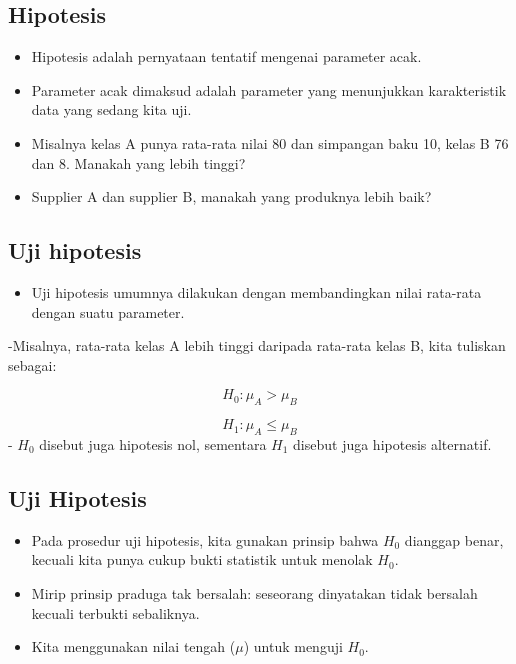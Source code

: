 \documentclass[
  letterpaper,
  DIV=11,
  numbers=noendperiod]{scrartcl}
\providecommand{\tightlist}{%
  \setlength{\itemsep}{0pt}\setlength{\parskip}{0pt}}\usepackage{longtable,booktabs,array}
\begin{document}
\subsection{Hipotesis}\label{hipotesis}

\begin{itemize}
\item
  Hipotesis adalah pernyataan tentatif mengenai parameter acak.
\item
  Parameter acak dimaksud adalah parameter yang menunjukkan
  karakteristik data yang sedang kita uji.
\item
  Misalnya kelas A punya rata-rata nilai 80 dan simpangan baku 10, kelas
  B 76 dan 8. Manakah yang lebih tinggi?
\item
  Supplier A dan supplier B, manakah yang produknya lebih baik?
\end{itemize}

\subsection{Uji hipotesis}\label{uji-hipotesis-1}

\begin{itemize}
\tightlist
\item
  Uji hipotesis umumnya dilakukan dengan membandingkan nilai rata-rata
  dengan suatu parameter.
\end{itemize}

-Misalnya, rata-rata kelas A lebih tinggi daripada rata-rata kelas B,
kita tuliskan sebagai:

\[
H_0: \mu_A > \mu_B
\]

\[
H_1: \mu_A \leq \mu_B
\] - \(H_0\) disebut juga hipotesis nol, sementara \(H_1\) disebut juga
hipotesis alternatif.

\subsection{Uji Hipotesis}\label{uji-hipotesis-2}

\begin{itemize}
\item
  Pada prosedur uji hipotesis, kita gunakan prinsip bahwa \(H_0\)
  dianggap benar, kecuali kita punya cukup bukti statistik untuk menolak
  \(H_0\).
\item
  Mirip prinsip praduga tak bersalah: seseorang dinyatakan tidak
  bersalah kecuali terbukti sebaliknya.
\item
  Kita menggunakan nilai tengah (\(\mu\)) untuk menguji \(H_0\).
\end{itemize}
\end{document}
